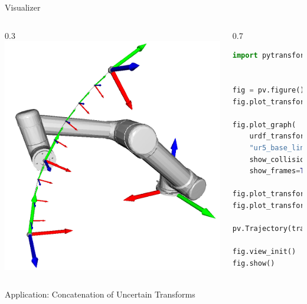 \documentclass[14pt]{beamer}
\begin{document}
\begin{frame}[fragile]{Visualizer}
\begin{columns}
\begin{column}{0.3\textwidth}
\includegraphics[width=\textwidth]{images/movement_primitives_cart_dmp_ur5}
\end{column}
\begin{column}{0.7\textwidth}
\begin{lstlisting}[language=Python]
import pytransform3d.visualizer as pv


fig = pv.figure()
fig.plot_transform(s=0.3)

fig.plot_graph(
    urdf_transform_manager,
    "ur5_base_link",
    show_collision_objects=True,
    show_frames=True)

fig.plot_transform(ee2base_start)
fig.plot_transform(ee2base_end)

pv.Trajectory(trajectory).add_artist(fig)

fig.view_init()
fig.show()
\end{lstlisting}
\end{column}
\end{columns}
\end{frame}

\begin{frame}
\begin{center}
\Large
Application: Concatenation of Uncertain Transforms
\end{center}
\end{frame}
\end{document}
